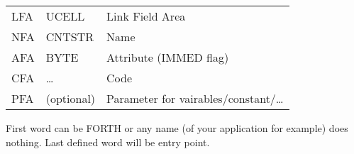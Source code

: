 \clearpage
{}\label{uvocab}

\begin{tabular}{l l l}
LFA & UCELL & Link Field Area \\
NFA & CNTSTR & Name \\
AFA & BYTE & Attribute (IMMED flag) \\
CFA & \ldots & Code \\
PFA & (optional) & Parameter for vairables/constant/\ldots\\
\end{tabular}

First word can be FORTH or any name (of your application for example) does
nothing. Last defined word will be entry point.
